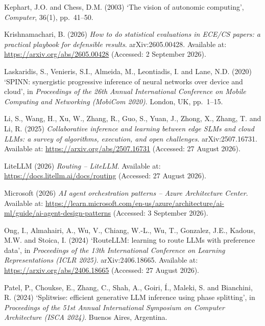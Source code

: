 \begin{list}{}{\setlength{\leftmargin}{1.5em}\setlength{\itemindent}{-1.5em}\setlength{\itemsep}{0.6em}\setlength{\parsep}{0pt}}
\item Kephart, J.O. and Chess, D.M. (2003) `The vision of autonomic computing', \emph{Computer}, 36(1), pp.~41--50.

\item Krishnamachari, B. (2026) \emph{How to do statistical evaluations in ECE/CS papers: a practical playbook for defensible results}. arXiv:2605.00428. Available at: \url{https://arxiv.org/abs/2605.00428} (Accessed: 2 September 2026).

\item Laskaridis, S., Venieris, S.I., Almeida, M., Leontiadis, I. and Lane, N.D. (2020) `SPINN: synergistic progressive inference of neural networks over device and cloud', in \emph{Proceedings of the 26th Annual International Conference on Mobile Computing and Networking (MobiCom 2020)}. London, UK, pp.~1--15.

\item Li, S., Wang, H., Xu, W., Zhang, R., Guo, S., Yuan, J., Zhong, X., Zhang, T. and Li, R. (2025) \emph{Collaborative inference and learning between edge SLMs and cloud LLMs: a survey of algorithms, execution, and open challenges}. arXiv:2507.16731. Available at: \url{https://arxiv.org/abs/2507.16731} (Accessed: 27 August 2026).

\item LiteLLM (2026) \emph{Routing -- LiteLLM}. Available at: \url{https://docs.litellm.ai/docs/routing} (Accessed: 27 August 2026).

\item Microsoft (2026) \emph{AI agent orchestration patterns -- Azure Architecture Center}. Available at: \url{https://learn.microsoft.com/en-us/azure/architecture/ai-ml/guide/ai-agent-design-patterns} (Accessed: 3 September 2026).

\item Ong, I., Almahairi, A., Wu, V., Chiang, W.-L., Wu, T., Gonzalez, J.E., Kadous, M.W. and Stoica, I. (2024) `RouteLLM: learning to route LLMs with preference data', in \emph{Proceedings of the 13th International Conference on Learning Representations (ICLR 2025)}. arXiv:2406.18665. Available at: \url{https://arxiv.org/abs/2406.18665} (Accessed: 27 August 2026).

\item Patel, P., Choukse, E., Zhang, C., Shah, A., Goiri, {\'I}., Maleki, S. and Bianchini, R. (2024) `Splitwise: efficient generative LLM inference using phase splitting', in \emph{Proceedings of the 51st Annual International Symposium on Computer Architecture (ISCA 2024)}. Buenos Aires, Argentina.


\end{list}
